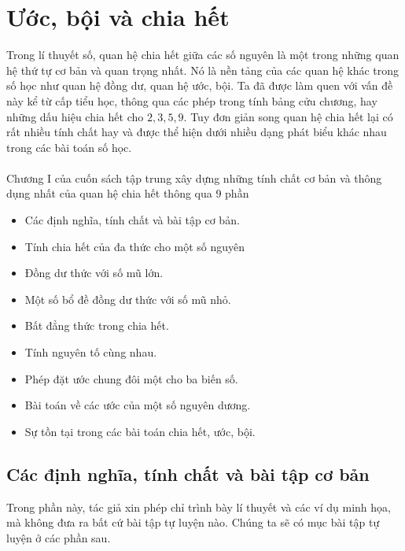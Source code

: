 \chapter{Ước, bội và chia hết}
Trong lí thuyết số, quan hệ chia hết giữa các số nguyên là một trong những quan hệ thứ tự cơ bản và quan trọng nhất. Nó là nền tảng của các quan hệ khác trong số học như quan hệ đồng dư, quan hệ ước, bội. Ta đã được làm quen với vấn đề này kể từ cấp tiểu học, thông qua các phép trong tính bảng cửu chương, hay những dấu hiệu chia hết cho $2,3,5,9.$ Tuy đơn giản song quan hệ chia hết lại có rất nhiều tính chất hay và được thể hiện dưới nhiều dạng phát biểu khác nhau trong các bài toán số học. \\ \\
Chương I của cuốn sách tập trung xây dựng những tính chất cơ bản và thông dụng nhất của quan hệ chia hết thông qua 9 phần
\begin{itemize}
    \item{} Các định nghĩa, tính chất và bài tập cơ bản.
    \item{} Tính chia hết của đa thức cho một số nguyên
    \item{} Đồng dư thức với số mũ lớn.
    \item{} Một số bổ đề đồng dư thức với số mũ nhỏ.
    \item{} Bất đẳng thức trong chia hết.
    \item{} Tính nguyên tố cùng nhau.
    \item{} Phép đặt ước chung đôi một cho ba biến số.
    \item{} Bài toán về các ước của một số nguyên dương.
    \item{} Sự tồn tại trong các bài toán chia hết, ước, bội.
\end{itemize}

\section{Các định nghĩa, tính chất và bài tập cơ bản}
Trong phần này, tác giả xin phép chỉ trình bày lí thuyết và các ví dụ minh họa, mà không đưa ra bất cứ bài tập tự luyện nào. Chúng ta sẽ có mục bài tập tự luyện ở các phần sau.
